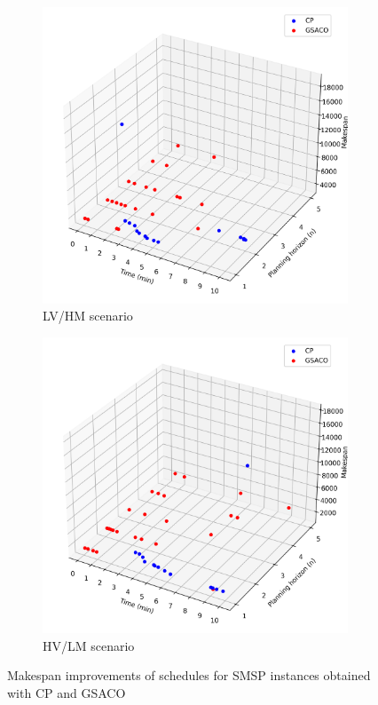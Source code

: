 \begin{figure}[t]
	\centering
	\begin{subfigure}[b]{0.45\linewidth}
		\includegraphics[width=\textwidth]{LVHM.png}
		\caption{LV/HM scenario}
		\label{subfig:l}
	\end{subfigure}
	\hfill
	\begin{subfigure}[b]{0.45\linewidth}
		\includegraphics[width=\textwidth]{HVLM.png}
		\caption{HV/LM scenario}
		\label{subfig:h}
	\end{subfigure}
	\caption{Makespan improvements of schedules for SMSP instances obtained with CP and GSACO \cite{Ali2024}\label{fig:makespan}}
\end{figure}

